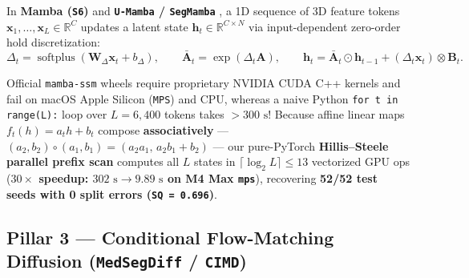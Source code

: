 \documentclass[10.5pt,a4paper]{article}
\begin{document}
In \textbf{Mamba (\texttt{S6})} \cite{gu2024mamba} and \textbf{\texttt{U-Mamba} / \texttt{SegMamba}} \cite{ma2024umamba,xing2024segmamba}, a 1D sequence of 3D feature tokens $\mathbf{x}_1, \dots, \mathbf{x}_L \in \mathbb{R}^C$ updates a latent state $\mathbf{h}_t \in \mathbb{R}^{C\times N}$ via input-dependent zero-order hold discretization:
\begin{equation}
    \Delta_t = \operatorname{softplus}(\mathbf{W}_\Delta \mathbf{x}_t + b_\Delta), \qquad \bar{\mathbf{A}}_t = \exp(\Delta_t \mathbf{A}), \qquad \mathbf{h}_t = \bar{\mathbf{A}}_t \odot \mathbf{h}_{t-1} + (\Delta_t \mathbf{x}_t) \otimes \mathbf{B}_t.
\end{equation}
\begin{warningbox}
Official \texttt{mamba-ssm} wheels require proprietary NVIDIA CUDA C++ kernels and fail on macOS Apple Silicon (\texttt{MPS}) and CPU, whereas a naive Python \texttt{for t in range(L):} loop over $L = 6{,}400$ tokens takes $>300\text{ s}$! Because affine linear maps $f_t(h) = a_t h + b_t$ compose \textbf{associatively} --- $(a_2, b_2) \circ (a_1, b_1) = (a_2 a_1,\, a_2 b_1 + b_2)$ --- our pure-PyTorch \textbf{Hillis--Steele parallel prefix scan} computes all $L$ states in $\lceil \log_2 L \rceil \le 13$ vectorized GPU ops (\textbf{$30\times$ speedup: $302\text{ s} \rightarrow 9.89\text{ s}$ on M4 Max \texttt{mps}}), recovering \textbf{52/52 test seeds with 0 split errors (\texttt{SQ = 0.696})}.
\end{warningbox}

\subsection{Pillar 3 --- Conditional Flow-Matching Diffusion (\texttt{MedSegDiff} / \texttt{CIMD})}
\end{document}
